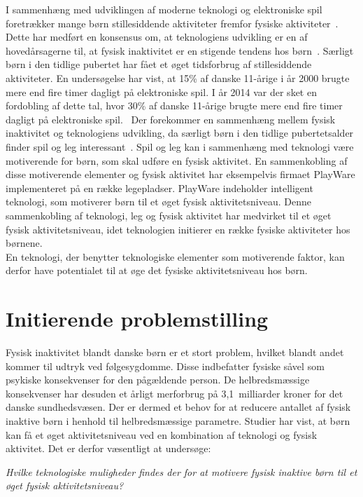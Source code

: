 I sammenhæng med udviklingen af moderne teknologi og elektroniske spil foretrækker mange børn stillesiddende aktiviteter fremfor fysiske aktiviteter~\citep{Universitet2014}. Dette har medført en konsensus om, at teknologiens udvikling er en af hovedårsagerne til, at fysisk inaktivitet er en stigende tendens hos børn~\citep{Kiens2007}.
Særligt børn i den tidlige pubertet har fået et øget tidsforbrug af stillesiddende aktiviteter. En undersøgelse har vist, at 15\% af danske 11-årige i år 2000 brugte mere end fire timer dagligt på elektroniske spil. I år 2014 var der sket en fordobling af dette tal, hvor 30\% af danske 11-årige brugte mere end fire timer dagligt på elektroniske spil.~\citep{Universitet2014} \newline
Der forekommer en sammenhæng mellem fysisk inaktivitet og teknologiens udvikling, da særligt børn i den tidlige pubertetsalder finder spil og leg interessant~\citep{Wied2011}. Spil og leg kan i sammenhæng med teknologi være motiverende for børn, som skal udføre en fysisk aktivitet. En sammenkobling af disse motiverende elementer og fysisk aktivitet har eksempelvis firmaet PlayWare implementeret på en række legepladser. PlayWare indeholder intelligent teknologi, som motiverer børn til et øget fysisk aktivitetsniveau. Denne sammenkobling af teknologi, leg og fysisk aktivitet har medvirket til et øget fysisk aktivitetsniveau, idet teknologien initierer en række fysiske aktiviteter hos børnene.~\citep{Rishoej2010} \\
En teknologi, der benytter teknologiske elementer som motiverende faktor, kan derfor have potentialet til at øge det fysiske aktivitetsniveau hos børn.

\section{Initierende problemstilling}
Fysisk inaktivitet blandt danske børn er et stort problem, hvilket blandt andet kommer til udtryk ved følgesygdomme. Disse indbefatter fysiske såvel som psykiske konsekvenser for den pågældende person. De helbredsmæssige konsekvenser har desuden et årligt merforbrug på 3,1~milliarder kroner for det danske sundhedsvæsen. Der er dermed et behov for at reducere antallet af fysisk inaktive børn i henhold til helbredsmæssige parametre. Studier har vist, at børn kan få et øget aktivitetsniveau ved en kombination af teknologi og fysisk aktivitet. Det er derfor væsentligt at undersøge: 

\begin{center}
\textit{Hvilke teknologiske muligheder findes der for at motivere fysisk inaktive børn til et øget fysisk aktivitetsniveau?}
\end{center}